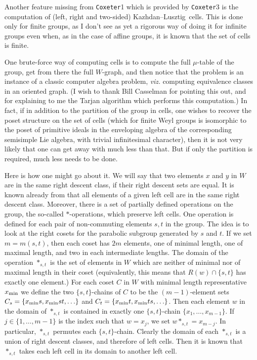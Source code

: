 \documentclass[11pt]{article}
\newcommand{\coxeter}{{\tt Coxeter}}
\newcommand{\kl}{Kazh\-dan--Lusz\-tig}
\renewcommand{\min}{_{\rm min}}
\begin{document}
Another feature missing from \coxeter1 which is provided by \coxeter3 is the
computation of (left, right and two-sided) \kl\ cells. This is done only for
finite groups, as I don't see as yet a rigorous way of doing it for infinite
groups even when, as in the case of affine groups, it is known that the set
of cells is finite.

One brute-force way of computing cells is to compute the full $\mu$-table of
the group, get from there the full $W$-graph, and then notice that the problem
is an instance of a classic computer algebra problem, {\em viz.} computing
equivalence classes in an oriented graph. (I wish to thank Bill Casselman for
pointing this out, and for explaining to me the Tarjan algorithm which
performs this computation.) In fact, if in addition to the partition of the
group in cells, one wishes to recover the poset structure on the set of cells
(which for finite Weyl groups is isomorphic to the poset of primitive ideals
in the enveloping algebra of the corresponding semisimple Lie algebra, with
trivial infinitesimal character), then it is not very likely that one can get
away with much less than that. But if only the partition is required, much
less needs to be done.

Here is how one might go about it. We will say that two elements $x$ and $y$
in $W$ are in the same right descent class, if their right descent sets are
equal. It is known already from \cite{kl:1979} that all elements of a given 
left cell are in the same right descent class.
Moreover, there is a set of partially defined operations on the group, the 
so-called $*$-operations, which preserve left cells. One operation is defined
for each pair of non-commuting elements $s,t$ in the group. The idea is to
look at the right cosets for the parabolic subgroup generated by $s$ and $t$.
If we set $m=m(s,t)$, then each coset has $2m$ elements, one of minimal
length, one of maximal length, and two in each intermediate lengths. The
domain of the operation $*_{s,t}$ is the set of elements in $W$ which are
neither of minimal nor of maximal length in their coset (equivalently, this
means that $R(w)\cap\{s,t\}$ has exactly one element.) For each coset $C$
in $W$ with minimal length representative $x\min$ we define the two 
$\{s,t\}$-chains of $C$ to be the $(m-1)$-element sets 
$C_s=\{x\min s,x\min st,\ldots\}$ and $C_t=\{x\min t,x\min ts,\ldots\}$.
Then each element $w$ in the domain of $*_{s,t}$ is contained in exactly one
$\{s,t\}$-chain $\{x_1,\ldots,x_{m-1}\}$. If $j\in\{1,\ldots,m-1\}$ is the 
index such that $w=x_j$, we set $w*_{s,t}=x_{m-j}$. In particular, $*_{s,t}$
permutes each $\{s,t\}$-chain. Clearly the domain of each $*_{s,t}$ is a
union of right descent classes, and therefore of left cells. Then it is known
\cite{lusztig:1985} that $*_{s,t}$ takes each left cell in its domain to 
another left cell.
\end{document}
